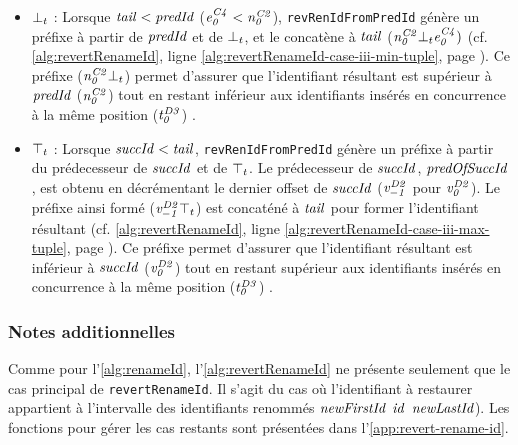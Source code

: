 \begin{itemize}
    \item[~] $\bot_t$ : Lorsque $\mathit{tail} < \mathit{predId}$ ($\mathit{e}^{\mathit{C4}}_{\mathit{0}} < \mathit{n}^{\mathit{C2}}_{\mathit{0}}$), \texttt{revRenIdFromPredId} génère un préfixe à partir de $\mathit{predId}$ et de $\bot_t$, et le concatène à $\mathit{tail}$ ($\mathit{n}^{\mathit{C2}}_{\mathit{0}}\bot_t\mathit{e}^{\mathit{C4}}_{\mathit{0}})$ (cf. \autoref{alg:revertRenameId}, ligne \ref{alg:revertRenameId-case-iii-min-tuple}, page \pageref{alg:revertRenameId-case-ii}).
    Ce préfixe ($\mathit{n}^{\mathit{C2}}_{\mathit{0}}\bot_t$) permet d'assurer que l'identifiant résultant est supérieur à $\mathit{predId}$ ($\mathit{n}^{\mathit{C2}}_{\mathit{0}}$) tout en restant inférieur aux identifiants insérés en concurrence à la même position ($\mathit{t}^{\mathit{D3}}_{\mathit{0}}$) .
    \item[~] $\top_t$ : Lorsque $\mathit{succId} < \mathit{tail}$, \texttt{revRenIdFromPredId} génère un préfixe à partir du prédecesseur de $\mathit{succId}$ et de $\top_t$.
        Le prédecesseur de $\mathit{succId}$, $\mathit{predOfSuccId}$, est obtenu en décrémentant le dernier offset de $\mathit{succId}$ (\eg $\mathit{v}^{\mathit{D2}}_{\mathit{-1}}$ pour $\mathit{v}^{\mathit{D2}}_{\mathit{0}}$).
        Le préfixe ainsi formé ($\mathit{v}^{\mathit{D2}}_{\mathit{-1}}\top_t$) est concaténé à $\mathit{tail}$ pour former l'identifiant résultant (cf. \autoref{alg:revertRenameId}, ligne \ref{alg:revertRenameId-case-iii-max-tuple}, page \pageref{alg:revertRenameId-case-ii}).
        Ce préfixe permet d'assurer que l'identifiant résultant est inférieur à $\mathit{succId}$ ($\mathit{v}^{\mathit{D2}}_{\mathit{0}}$) tout en restant supérieur aux identifiants insérés en concurrence à la même position ($\mathit{t}^{\mathit{D3}}_{\mathit{0}}$) .
\end{itemize}


\subsubsection{Notes additionnelles}

Comme pour l'\autoref{alg:renameId}, l'\autoref{alg:revertRenameId} ne présente seulement que le cas principal de \texttt{revertRenameId}.
Il s'agit du cas où l'identifiant à restaurer appartient à l'intervalle des identifiants renommés $\mathit{newFirstId}$ \leqid $\mathit{id}$ \leqid $\mathit{newLastId}$).
Les fonctions pour gérer les cas restants sont présentées dans l'\autoref{app:revert-rename-id}.\\

